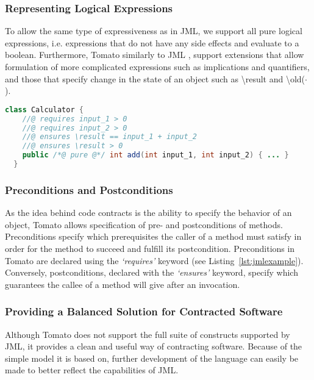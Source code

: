 \subsubsection{Representing Logical Expressions}
\label{sub:Representing Logical Expressions}
To allow the same type of expressiveness as in JML, we support all pure
logical expressions, i.e. expressions that do not have any side effects and evaluate to a boolean.
Furthermore, Tomato similarly to JML \cite{leavens2006design},
support extensions that allow formulation of more complicated
expressions such as implications and quantifiers,
and those that specify change in the state of an object such as \textbackslash result
and \textbackslash old($\cdot$).

\begin{lstlisting}[language=Java,caption={Contracted Method for Adding Natural Numbers},label={lst:jmlexample}]
  class Calculator {
    //@ requires input_1 > 0
    //@ requires input_2 > 0
    //@ ensures \result == input_1 + input_2
    //@ ensures \result > 0
    public /*@ pure @*/ int add(int input_1, int input_2) { ... }
  }
\end{lstlisting}

\subsubsection{Preconditions and Postconditions}
\label{sub:Preconditions and Postconditions}

As the idea behind code contracts is the ability to specify the behavior of
an object, Tomato allows specification of pre- and postconditions of methods.
Preconditions specify which prerequisites the caller of a method must
satisfy in order for the method to succeed and fulfill its postcondition.
Preconditions in Tomato are declared using the \emph{`requires'}
keyword (see Listing~\ref{lst:jmlexample}).
Conversely, postconditions, declared with the \emph{`ensures'} keyword,
specify which guarantees the callee of a method will give after an invocation.

\subsubsection{Providing a Balanced Solution for Contracted Software}
\label{ssub:ProvidingaBalancedSolutionforContractedSoftware}
Although Tomato does not support the full suite of constructs supported by JML, it provides a clean and useful way of contracting software. Because of 
the simple model it is based on, further development of the language can easily be made to better reflect the capabilities of JML.
